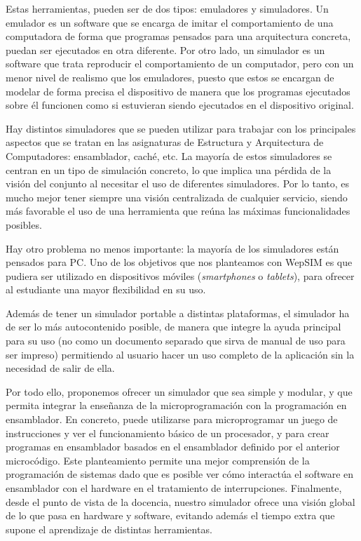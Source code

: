 Estas herramientas, pueden ser de dos tipos: emuladores y simuladores. Un emulador es un software que se encarga de imitar el comportamiento de una computadora de forma que programas pensados para una arquitectura concreta, puedan ser ejecutados en otra diferente. Por otro lado, un simulador es un software que trata reproducir el comportamiento de un computador, pero con un menor nivel de realismo que los emuladores, puesto que estos se encargan de modelar de forma precisa el dispositivo de manera que los programas ejecutados sobre él funcionen como si estuvieran siendo ejecutados en el dispositivo original.

Hay distintos simuladores que se pueden utilizar para trabajar con los principales aspectos que se tratan en las asignaturas de Estructura y Arquitectura de Computadores: ensamblador, caché, etc. La mayoría de estos simuladores se centran en un tipo de simulación concreto, lo que implica una pérdida de la visión del conjunto al necesitar el uso de diferentes simuladores. Por lo tanto, es mucho mejor tener siempre una visión centralizada de cualquier servicio, siendo más favorable el uso de una herramienta que reúna las máximas funcionalidades posibles.

Hay otro problema no menos importante: la mayoría de los simuladores están pensados para PC. Uno de los objetivos que nos planteamos con WepSIM es que pudiera ser utilizado en dispositivos móviles (\emph{smartphones} o \emph{tablets}), para ofrecer al estudiante una mayor flexibilidad en su uso.

Además de tener un simulador portable a distintas plataformas, el simulador ha de ser lo más autocontenido posible, de manera que integre la ayuda principal para su uso (no como un documento separado que sirva de manual de uso para ser impreso) permitiendo al usuario hacer un uso completo de la aplicación sin la necesidad de salir de ella.

Por todo ello, proponemos ofrecer un simulador que sea simple y modular, y que permita integrar la enseñanza de la microprogramación con la programación en ensamblador. En concreto, puede utilizarse para microprogramar un juego de instrucciones y ver el funcionamiento básico de un procesador, y para crear programas en ensamblador basados en el ensamblador definido por el anterior microcódigo. Este planteamiento permite una mejor comprensión de la programación de sistemas dado que es posible ver cómo interactúa el software en ensamblador con el hardware en el tratamiento de interrupciones. Finalmente, desde el punto de vista de la docencia, nuestro simulador ofrece una visión global de lo que pasa en hardware y software, evitando además el tiempo extra que supone el aprendizaje de distintas herramientas.


